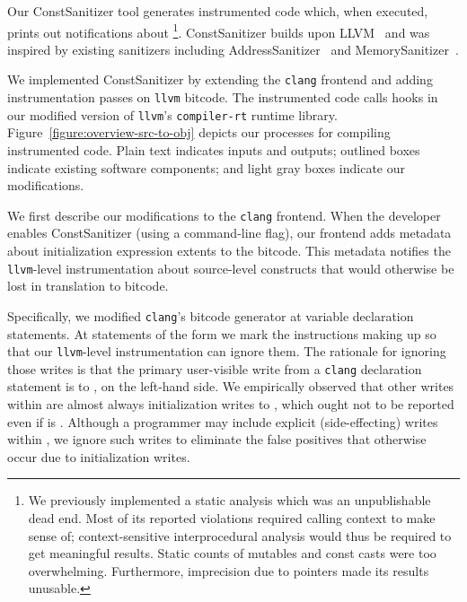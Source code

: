 Our ConstSanitizer tool generates instrumented code which, when executed,
prints out notifications about \wstcqs
\footnote{We previously implemented a static analysis which was an unpublishable
          dead end. Most of its reported violations required calling context to
          make sense of; context-sensitive interprocedural analysis would thus
          be required to get meaningful results.
          Static counts of mutables and const casts were too overwhelming.
          Furthermore, imprecision due to pointers made its results unusable.}.
ConstSanitizer builds upon LLVM~\cite{llvm} and was inspired by existing
sanitizers including AddressSanitizer~\cite{2012-usenix-serebryany} and
MemorySanitizer~\cite{2015-cgo-stepanov}.

We implemented ConstSanitizer by extending the \texttt{clang} frontend and
adding instrumentation passes on \texttt{llvm} bitcode.
The instrumented code calls hooks in our modified version of \texttt{llvm}'s
\texttt{compiler-rt} runtime library.
Figure~\ref{figure:overview-src-to-obj} depicts our processes for compiling
instrumented code.
Plain text indicates inputs and outputs; outlined boxes indicate existing
software components; and light gray boxes indicate our modifications.

We first describe our modifications to the \texttt{clang} frontend.
When the developer enables ConstSanitizer (using a command-line flag), our
frontend adds metadata about initialization expression extents to the bitcode.
This metadata notifies the \texttt{llvm}-level instrumentation about
source-level constructs that would otherwise be lost in translation to bitcode.

Specifically, we modified \texttt{clang}'s bitcode generator at variable
declaration statements.
At statements of the form  we mark the instructions
making up  so that our \texttt{llvm}-level
instrumentation can ignore them.
The rationale for ignoring those writes is that the primary user-visible write
from a \texttt{clang} declaration statement is to , on the
left-hand side.
We empirically observed that other writes within  are almost always
initialization writes to , which ought
not to be reported even if  is \const{}.
Although a programmer may include explicit (side-effecting) writes within
, we ignore such writes to eliminate the false positives
that otherwise occur due to initialization writes.

